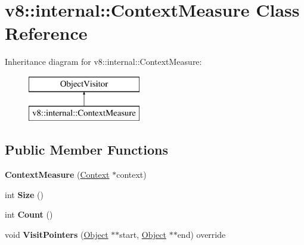 \hypertarget{classv8_1_1internal_1_1_context_measure}{}\section{v8\+:\+:internal\+:\+:Context\+Measure Class Reference}
\label{classv8_1_1internal_1_1_context_measure}
Inheritance diagram for v8\+:\+:internal\+:\+:Context\+Measure\+:\begin{figure}[H]
\begin{center}
\leavevmode
\includegraphics[height=2.000000cm]{classv8_1_1internal_1_1_context_measure}
\end{center}
\end{figure}
\subsection*{Public Member Functions}
\begin{DoxyCompactItemize}
\item 
{\bfseries Context\+Measure} (\hyperlink{classv8_1_1internal_1_1_context}{Context} $\ast$context)\hypertarget{classv8_1_1internal_1_1_context_measure_a9ed687d7e7fdd407ae769bb65a714be1}{}\label{classv8_1_1internal_1_1_context_measure_a9ed687d7e7fdd407ae769bb65a714be1}

\item 
int {\bfseries Size} ()\hypertarget{classv8_1_1internal_1_1_context_measure_ad1407e57c2049097c33154ff0c73b0e5}{}\label{classv8_1_1internal_1_1_context_measure_ad1407e57c2049097c33154ff0c73b0e5}

\item 
int {\bfseries Count} ()\hypertarget{classv8_1_1internal_1_1_context_measure_adb4b85a75342e30e6b17b35e0d27a48e}{}\label{classv8_1_1internal_1_1_context_measure_adb4b85a75342e30e6b17b35e0d27a48e}

\item 
void {\bfseries Visit\+Pointers} (\hyperlink{classv8_1_1internal_1_1_object}{Object} $\ast$$\ast$start, \hyperlink{classv8_1_1internal_1_1_object}{Object} $\ast$$\ast$end) override\hypertarget{classv8_1_1internal_1_1_context_measure_a006992992d8f530e76b0bb8c2d5a6c4d}{}\label{classv8_1_1internal_1_1_context_measure_a006992992d8f530e76b0bb8c2d5a6c4d}

\end{DoxyCompactItemize}
